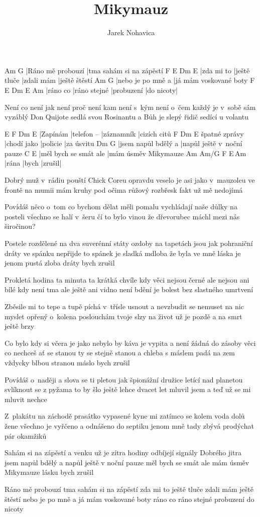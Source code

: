 \documentclass{song}
\author{Jarek Nohavica}
\title{Mikymauz}
\begin{document}
\strophe
Am                G
|Ráno mě probouzí |tma sahám si na zápěstí
F          E            Dm         E
|zda mi to |ještě tluče |zdali mám |ještě štěstí
Am                G
|nebo je po mně a |já mám voskované boty
F        E            Dm         E         Am
|ráno co |ráno stejné |probuzení |do nicoty|
\endstrophe

\strophe*
Není co není jak není proč není kam
není s~kým není o~čem každý je v~sobě sám
vyzáblý Don Quijote sedlá svou Rosinantu
a Bůh je slepý řidič sedící u volantu
\endstrophe

E        F           Dm         E
|Zapínám |telefon -- |záznamník |cizích citů
              F           Dm       E
špatné zprávy |chodí jako |policie |za úsvitu
Dm                  G\7
|jsem napůl bdělý a |napůl ještě v~noční pauze
C                     E
|měl bych se smát ale |mám úsměv Mikymauze
Am    Am/G  F      E\,Am
|rána |bych |zrušil|
\endstrophe

\strophe*
Dobrý muž v~rádiu pouští Chick Coreu
opravdu veselo je asi jako v~mauzoleu
ve frontě na mumii mám kruhy pod očima
růžový rozbřesk fakt už mě nedojímá
\endstrophe

\strophe*
Povídáš něco o~tom co bychom dělat měli
pomalu vychládají naše důlky na posteli
všechno se halí v~šeru čí to bylo vinou
že dřevorubec máchl mezi nás širočinou?
\endstrophe

Postele rozdělené na dva suverénní státy
ozdoby na tapetách jsou jak pohraniční dráty
ve spánku nepřijde to spánek je sladká mdloba
že byla ve mně láska je jenom pustá zloba
dráty bych zrušil
\endstrophe

\strophe*
Prokletá hodina ta minuta ta krátká chvíle
kdy věci nejsou černé ale nejsou ani bílé
kdy není tma ale ještě ani vidno není
bdění je bolest bez slastného umrtvení
\endstrophe

\strophe*
Zběsile mi to tepe a tupě píchá v~třísle
usnout a nevzbudit se nemuset na nic myslet
opřený o~kolena poslouchám tvoje slzy
na život už je pozdě a na smrt ještě brzy
\endstrophe

Co bylo kdy si včera je jako nebylo by
káva je vypita a není žádná do zásoby
věci co nechceš ať se stanou ty se stejně stanou
a chleba s máslem padá na zem vždycky blbou stranou
máslo bych zrušil
\endstrophe

\strophe*
Povídáš o~naději a slova se ti pletou
jak špionážní družice letící nad planetou
svlíknout se z pyžama to by šlo ještě lehce
dvacet let mluvil jsem a teď už se mi mluvit nechce
\endstrophe

\strophe*
Z~plakátu na záchodě prasátko vypasené
kyne mi zatímco se kolem voda dolů žene
všechno je vyřčeno a odnášeno do septiku
jenom mně tady zbývá prodýchat pár okamžiků
\endstrophe

Sahám si na zápěstí a venku už je zítra
hodiny odbíjejí signály Dobrého jitra
jsem napůl bdělý a napůl ještě v noční pauze
měl bych se smát ale mám úsměv Mikymauze
lásku bych zrušil
\endstrophe

\strophe*
Ráno mě probouzí tma sahám si na zápěstí
zda mi to ještě tluče zdali mám ještě štěstí
nebo je po mně a já mám voskované boty
ráno co ráno stejné probuzení do nicoty
\endstrophe
\end{document}

